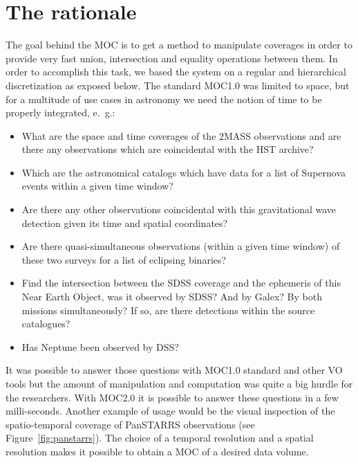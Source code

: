 \documentclass[11pt,a4paper]{ivoa}
\begin{document}
\section{The rationale}
\label{sec:usecases}
The goal behind the MOC is to get a method to manipulate coverages in
order to provide very fast union, intersection and
equality operations between them. In order to accomplish this task, we
based the system on a regular and hierarchical discretization as
exposed below. The standard MOC1.0 was limited to space, but for a
multitude of use cases in astronomy we need the notion of time to be
properly integrated, e.~g.:
\begin{itemize}
\item What are the space and time coverages of the 2MASS observations
  and are there any observations which are coincidental with the HST
  archive?
\item Which are the astronomical catalogs which have data for a list
  of Supernova events within a given time window?
\item Are there any other observations coincidental with this
  gravitational wave detection given its time and spatial coordinates?
\item Are there quasi-simultaneous observations (within a given time
  window) of these two surveys for a list of eclipsing binaries?
\item Find the intersection between the SDSS coverage and the
  ephemeris of this Near Earth Object, was it observed by SDSS? And
  by Galex? By both missions simultaneously? If so, are there
  detections within the source catalogues?
\item Has Neptune been observed by DSS?
\end{itemize}

It was possible to answer those questions with MOC1.0 standard and
other VO tools but the amount of manipulation and computation was
quite a big hurdle for the researchers. With MOC2.0 it is possible
to answer these questions in a few milli-seconds. Another example
of usage would be the visual inspection of the spatio-temporal
coverage of PanSTARRS observations (see Figure~\ref{fig:panstarrs}). 
The choice of a temporal resolution and a spatial resolution makes it
possible to obtain a MOC of a desired data volume. 
\end{document}
